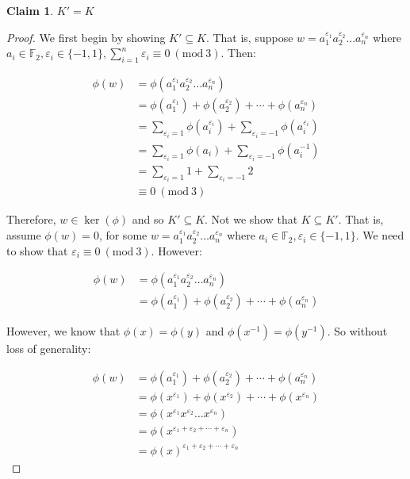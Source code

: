 \documentclass[12pt]{article}%
\newtheorem{claim}[theorem]{Claim}
\newcommand{\F}{\mathbb{F}}
\newcommand{\Mod}[1]{\ (\mathrm{mod}\ #1)}
\begin{document}
\begin{claim}
$K'=K$
\end{claim}

\begin{proof}
We first begin by showing $K' \subseteq K$. That is, suppose
$w=a_{1}^{\varepsilon_1}a_{2}^{\varepsilon_2}\ldots a_{n}^{\varepsilon_n}$ where $a_i\in \F_2,
\varepsilon_i\in \{-1, 1\}, \sum_{i=1}^{n} \varepsilon_i \equiv 0 \Mod{3}$. Then:

\begin{align*}
\phi(w)
&=\phi(a_{1}^{\varepsilon_1}a_{2}^{\varepsilon_2}\ldots a_{n}^{\varepsilon_n}) \\
&=\phi(a_{1}^{\varepsilon_1})+\phi(a_{2}^{\varepsilon_2})+\cdots +\phi(a_{n}^{\varepsilon_n}) \\
&=\sum_{\varepsilon_i=1}  \phi(a_{i}^{\varepsilon_i})+\sum_{\varepsilon_i=-1}  \phi(a_{i}^{\varepsilon_i}) \\
&=\sum_{\varepsilon_i=1}  \phi(a_{i})+\sum_{\varepsilon_i=-1}  \phi(a_{i}^{-1}) \\
&=\sum_{\varepsilon_i=1}  1+\sum_{\varepsilon_i=-1}  2 \\
&\equiv 0 \Mod{3}
\end{align*}

Therefore, $w\in \ker(\phi)$ and so $K' \subseteq K$. Not we show that $K \subseteq K'$. That is, assume
$\phi(w)=0$, for some $w=a_{1}^{\varepsilon_1}a_{2}^{\varepsilon_2}\ldots a_{n}^{\varepsilon_n}$ where
$a_i\in \F_2, \varepsilon_i\in \{-1, 1\}$. We need to show that $\varepsilon_i \equiv 0 \Mod{3}$. However:

\begin{align*}
\phi(w)
&=\phi(a_{1}^{\varepsilon_1}a_{2}^{\varepsilon_2}\ldots a_{n}^{\varepsilon_n}) \\
&=\phi(a_{1}^{\varepsilon_1})+\phi(a_{2}^{\varepsilon_2})+\cdots +\phi(a_{n}^{\varepsilon_n}) 
\end{align*}

However, we know that $\phi(x)=\phi(y)$ and $\phi(x^{-1})=\phi(y^{-1})$. So without loss of generality:

\begin{align*}
\phi(w)
&=\phi(a_{1}^{\varepsilon_1})+\phi(a_{2}^{\varepsilon_2})+\cdots +\phi(a_{n}^{\varepsilon_n}) \\
&=\phi(x^{\varepsilon_1})+\phi(x^{\varepsilon_2})+\cdots +\phi(x^{\varepsilon_n}) \\
&=\phi(x^{\varepsilon_1}x^{\varepsilon_2}\ldots x^{\varepsilon_n}) \\
&=\phi(x^{\varepsilon_1+\varepsilon_2+\cdots +\varepsilon_n}) \\
&=\phi(x)^{\varepsilon_1+\varepsilon_2+\cdots +\varepsilon_n}
\end{align*}


\end{proof}
\end{document}
